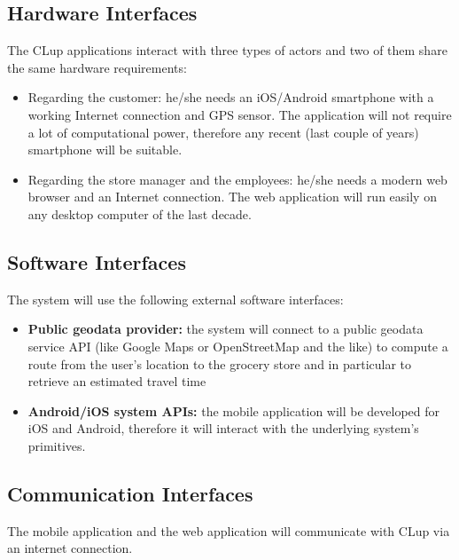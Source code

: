 \subsection{Hardware Interfaces}
\label{hardware interfaces}
The CLup applications interact with three types of actors and two of them share the same hardware requirements:
\begin{itemize}
    \item Regarding the customer: he/she needs an iOS/Android smartphone with a working Internet connection and GPS sensor. The application will not require a lot of computational power, therefore any recent (last couple of years) smartphone will be suitable.
    \item Regarding the store manager and the employees: he/she needs a modern web browser and an Internet connection. The web application will run easily on any desktop computer of the last decade.
\end{itemize}

\subsection{Software Interfaces}
The system will use the following external software interfaces:
\begin{itemize}
    \item \textbf{Public geodata provider:} the system will connect to a public geodata service API (like Google Maps or OpenStreetMap and the like) to compute a route from the user's location to the grocery store and in particular to retrieve an estimated travel time
    \item \textbf{Android/iOS system APIs:} the mobile application will be developed for iOS and Android, therefore it will interact with the underlying system's primitives.
\end{itemize}

\subsection{Communication Interfaces}
The mobile application and the web application will communicate with CLup via an internet connection.